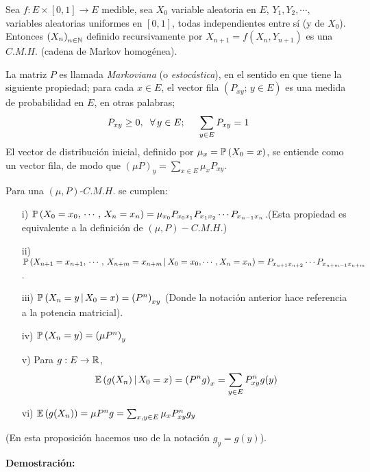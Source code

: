 \begin{lem}
\label{Lema 8}
Sea $f:E\times [0,1]\rightarrow E$ medible, sea $X_0$ variable aleatoria en $E$, $Y_1,Y_2,\cdots,$ variables aleatorias uniformes en $[0,1]$, todas independientes entre sí (y de $X_0$). Entonces $\left(X_n\right)_{n\in\mathbb N}$ definido recursivamente por $X_{n+1} = f(X_n,Y_{n+1})$ es una $C.M.H.$ (cadena de Markov homogénea).
\end{lem}
 La matriz $P$ es llamada \textit{Markoviana} (o \textit{estocástica}), en el sentido en que tiene la siguiente propiedad; para cada $x\in E$, el vector fila $\left(P_{xy};\,y\in E\right)$ es una medida de probabilidad en $E$, en otras palabras;
 \[P_{xy}\geq 0,\hspace{0.2cm}\forall\,y\in E;\hspace{0.5cm}\sum_{y\in E}P_{xy} = 1\]
 El vector de distribución inicial, definido por $\mu_x = \mathbb{P}\left(X_0 = x\right)$, se entiende como un vector fila, de modo que $\left(\mu P\right)_y = \sum_{x\in E}\mu_xP_{xy}$.\\ \newline
 
\begin{prop}
Para una $(\mu,P)$-$C.M.H.$ se cumplen:
\begin{enumerate}
    \item[i)] $\mathbb{P}\left(X_0=x_0,\,\cdots,\,X_n=x_n\right) = \mu_{x_0}P_{x_0x_1}P_{x_1x_2}\cdots P_{x_{n-1}x_n}$.(Esta propiedad es equivalente a la definición de $(\mu,P)-C.M.H.$)
    \item[ii)] $\mathbb{P}\left(X_{n+1}=x_{n+1},\,\cdots,\,X_{n+m}=x_{n+m}\,|\,X_0=x_0,\cdots,X_n=x_n\right) = P_{x_{n+1}x_{n+2}}\cdots P_{x_{n+m-1}x_{n+m}}$.
    \item[iii)] $\mathbb{P}\left(X_n=y\,|\,X_0=x\right) = \left(P^n\right)_{xy}$ (Donde la notación anterior hace referencia a la potencia matricial).
    \item[iv)] $\mathbb{P}\left(X_n = y\right) = \left(\mu P^n \right)_{y}$
    \item[v)] Para $g:E\rightarrow \mathbb R$, 
    \[\mathbb E\left(g(X_n)\,|\,X_0 = x\right) = \left(P^ng\right)_x = \sum_{y\in E} P^n_{xy} g(y)\]
    \item[vi)] $\mathbb E\left(g(X_n)\right) = \mu P^n g = \sum_{x,y\in E}\mu_x P^n_{xy}g_y$
\end{enumerate}
(En esta proposición hacemos uso de la notación $g_y = g(y)$).
\end{prop}

\textbf{Demostración: }\cite[págs. 20,21]{Pard}\\ \newline

